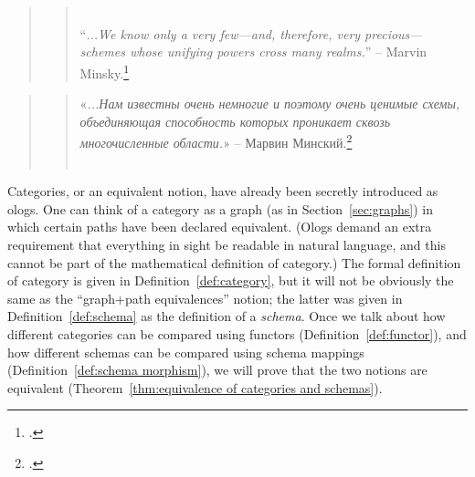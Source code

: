\documentclass[../main/CT4S-EN-RU]{subfiles}
\begin{document}
\section*{}

\begin{blockENG}
\begin{quote}
\begin{quote}
~\\
“{\it ...We know only a very few—and, therefore, very precious—schemes whose unifying powers cross many realms.}” – Marvin Minsky.\footnote{\cite[Problems of disunity, p. 126]{Min}.}
\end{quote}
\end{quote}
\end{blockENG}

\begin{blockRUS}
\begin{quote}
\begin{quote}
«{\it ...Нам известны очень немногие и поэтому очень ценимые схемы, объединяющая способность которых проникает сквозь многочисленные области.}» – Марвин Минский.\footnote{\cite[Проблемы разъединения, p. 126]{Min}.}~\\~
\end{quote}
\end{quote}
\end{blockRUS}

\begin{blockENG}
Categories, or an equivalent notion, have already been secretly introduced as ologs. One can think of a category as a graph (as in Section~\ref{sec:graphs}) in which certain paths have been declared equivalent. (Ologs demand an extra requirement that everything in sight be readable in natural language, and this cannot be part of the mathematical definition of category.) The formal definition of category is given in Definition~\ref{def:category}, but it will not be obviously the same as the “graph+path equivalences” notion; the latter was given in Definition~\ref{def:schema} as the definition of a {\em schema}. Once we talk about how different categories can be compared using functors (Definition~\ref{def:functor}), and how different schemas can be compared using schema mappings (Definition~\ref{def:schema morphism}), we will prove that the two notions are equivalent (Theorem~\ref{thm:equivalence of categories and schemas}).
\end{blockENG}
\end{document}
